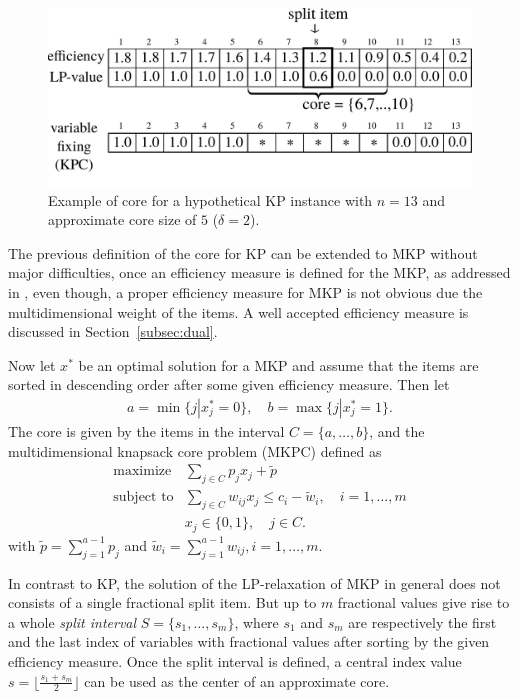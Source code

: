 \begin{figure}[ht]
  \centering
  \includegraphics[scale=0.406]{img/sce/kp_3}
  \caption{Example of core for a hypothetical KP instance with $n=13$ and approximate core size of $5$ ($\delta = 2$).}
  \label{fig:kpcore}
\end{figure}


The previous definition of the core for KP can be extended to MKP without major
difficulties, once an efficiency measure is defined for the MKP,
as addressed in \cite{puchinger2006core}, even though,
a proper efficiency measure for MKP is not obvious due the
multidimensional weight of the items.
A well accepted efficiency measure is discussed in Section~\ref{subsec:dual}.

Now let $x^*$ be an optimal solution for a MKP and assume that the items are
sorted in descending order after some given efficiency measure. Then let
\begin{align}
  a = \min \{ j | x_j^* = 0 \}, \quad b = \max \{ j | x_j^* = 1 \}.
\end{align}
The core is given by the items in the interval $C = \{ a, \ldots, b \}$,
and the multidimensional knapsack core problem (MKPC) defined as
\begin{align}
  \text{maximize} & \sum_{j \in C} p_j x_j  + \tilde{p}\\
  \text{subject to} & \sum_{j \in C} w_{ij} x_j \leqslant c_i - \tilde{w}_i, \quad i = 1, \ldots, m\\
  & x_j \in \{0, 1\}, \quad j \in C.
\end{align}
with $\tilde{p} = \sum^{a-1}_{j=1} p_j$  and $\tilde{w}_i = \sum^{a-1}_{j=1} w_{ij}, i = 1, \ldots, m$.

In contrast to KP, the solution of the LP-relaxation of MKP in general does not
consists of a single fractional split item. But up to $m$ fractional values give
rise to a whole \emph{split interval} $S = \{ s_1, \ldots, s_m\}$, where
$s_1$ and $s_m$ are respectively the first and the last index of variables with
fractional values after sorting by the given efficiency measure.
Once the split interval is defined, a central index value $s = \lfloor \frac{s_1+s_m}{2}\rfloor$
can be used as the center of an approximate core.

